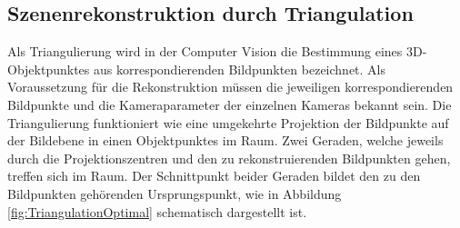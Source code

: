 



\subsection{Szenenrekonstruktion durch Triangulation}

Als Triangulierung wird in der Computer Vision die Bestimmung eines 3D-Objektpunktes aus korrespondierenden Bildpunkten bezeichnet. Als Voraussetzung für die Rekonstruktion müssen die jeweiligen korrespondierenden Bildpunkte und die Kameraparameter der einzelnen Kameras bekannt sein. Die Triangulierung funktioniert wie eine umgekehrte Projektion der Bildpunkte auf der Bildebene in einen Objektpunktes im Raum. Zwei Geraden, welche jeweils durch die Projektionszentren und den zu rekonstruierenden Bildpunkten gehen,  treffen sich im Raum. Der Schnittpunkt beider Geraden bildet den zu den Bildpunkten gehörenden Ursprungspunkt, wie in Abbildung \ref{fig:TriangulationOptimal} schematisch dargestellt ist.  \\\\




